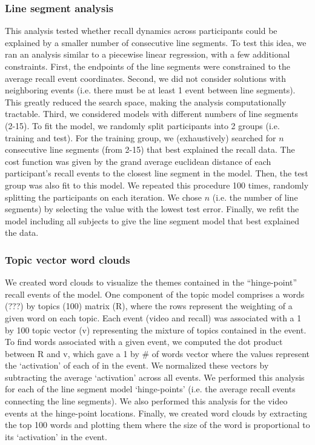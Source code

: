 \documentclass{article}
\begin{document}
{\subsubsection{Line segment analysis}
This analysis tested whether recall dynamics across participants could be explained by a smaller number of consecutive line segments.  To test this idea, we ran an analysis similar to a piecewise linear regression, with a few additional constraints. First, the endpoints of the line segments were constrained to the average recall event coordinates. Second, we did not consider solutions with neighboring events (i.e. there must be at least 1 event between line segments).  This greatly reduced the search space, making the analysis computationally tractable.  Third, we considered models with different numbers of line segments (2-15).  To fit the model, we randomly split participants into 2 groups (i.e. training and test). For the training group, we (exhaustively) searched for $n$ consecutive line segments (from 2-15) that best explained the recall data. The cost function was given by the grand average euclidean distance of each participant's recall events to the closest line segment in the model. Then, the test group was also fit to this model.  We repeated this procedure 100 times, randomly splitting the participants on each iteration.  We chose $n$ (i.e. the number of line segments) by selecting the value with the lowest test error.  Finally, we refit the model including all subjects to give the line segment model that best explained the data.

\subsubsection{Topic vector word clouds}
 We created word clouds to visualize the themes contained in the ``hinge-point'' recall events of the model. One component of the topic model comprises a words (???) by topics (100) matrix (R), where the rows represent the weighting of a given word on each topic. Each event (video and recall) was associated with a 1 by 100 topic vector (v) representing the mixture of topics contained in the event. To find words associated with a given event, we computed the dot product between R and v, which gave a 1 by \# of words vector where the values represent the `activation' of each of in the event. We normalized these vectors by subtracting the average `activation' across all events. We performed this analysis for each of the line segment model `hinge-points' (i.e. the average recall events connecting the line segments). We also performed this analysis for the video events at the hinge-point locations. Finally, we created word clouds by extracting the top 100 words and plotting them where the size of the word is proportional to its `activation' in the event.


}
\end{document}
